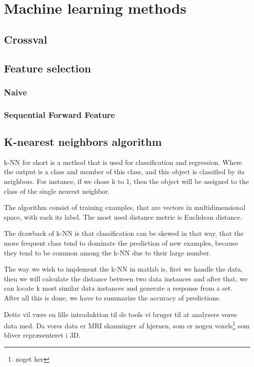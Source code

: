 \section{Machine learning methods}

\subsection{Crossval}



\subsection{Feature selection}

\subsubsection{Naive}

\subsubsection{Sequential Forward Feature}

\subsection{K-nearest neighbors algorithm}

k-NN for short is a method that is used for classification and regression. Where the output is a class and member of this class, and this object is classified by its neighbors. For instance, if we chose k to 1, then the object will be assigned to the class of the single nearest neighbor.

The algorithm consist of training examples, that are vectors in multidimensional space, with each its label. The most used distance metric is Euclidean distance.

The drawback of k-NN is that classification can be skewed in that way, that the more frequent class tend to dominate the prediction of new examples, because they tend to be common among the k-NN due to their large number.

The way we wish to implement the k-NN in matlab is, first we handle the data, then we will calculate the distance between two data instances and after that, we can locate k most similar data instances and generate a response from a set. After all this is done, we have to summarize the accuracy of predictions.


Dette vil være en lille introduktion til de tools vi bruger til at analysere vores data med. Da vores data er MRI skanninger af hjernen, som er nogen voxels\footnote{noget her} som bliver repræsenteret i 3D.\\



